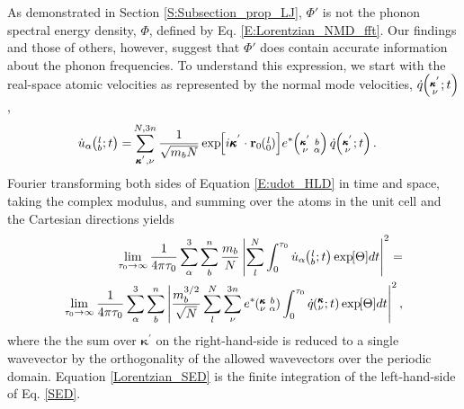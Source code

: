 As demonstrated in Section \ref{S:Subsection_prop_LJ}, $\Phi'$ is not 
the phonon spectral energy density, $\Phi$, defined by Eq$.$ 
\eqref{E:Lorentzian_NMD_fft}. Our findings and those of others,
\cite{maruyama_molecular_2003,koker_thermal_2009,
thomas_predicting_2010,qiu_molecular_2011,shiomi_thermal_2011} 
however, suggest that $\Phi'$ does contain accurate information about 
the phonon frequencies. To understand this expression, we start with 
the real-space atomic velocities as 
represented by the normal mode velocities, $\dot{q}\mspace{-4.0mu}\left(\mspace{-8.0mu} \begin{smallmatrix}&\pmb{\kappa}^{'} \\&\nu\end{smallmatrix} \mspace{-2.0mu};t\right)$ 
\cite{dove_introduction_1993},
\begin{equation}\label{E:udot_HLD}
\begin{split}
\dot{u}_{\alpha}\lbt = &\SUMprime{2}{} \frac{1}{\sqrt{m_bN}} 
\EXP{i\pmb{\kappa}^{'}\cdot\mathbf{r}_0\ab{l}{0}} e^*\kpvba 
\dot{q}\kpvt{}{}{}.
\end{split}
\end{equation}
Fourier transforming both sides of Equation \eqref{E:udot_HLD} in time 
and space, taking the complex modulus, and summing over the atoms in 
the unit cell 
and the Cartesian directions yields
\begin{equation}\label{SED}
\begin{split}
\lim_{\tau_0\rightarrow\infty}\frac{1}{4\pi\tau_0} \sum_\alpha^3 
\sum_b^n \frac{m_b}{N} 
\left\lvert \sum_l^N  \int_{0}^{\tau_0} \dot{u}_{\alpha}\lbt 
\EXP{\Theta} dt \right\rvert^2 =
\\ \lim_{\tau_0\rightarrow\infty}\frac{1}{4\pi\tau_0} \sum_\alpha^3 
\sum_b^n 
\left\lvert \frac{m_b^{3/2}}{\sqrt{N}} \sum_l^N \sum_{\nu}^{3n} e^*\kvba 
\int_{0}^{\tau_0}\dot{q}\kvt\EXP{\Theta}dt \right\rvert^2 ,
\end{split}
\end{equation}
where the the sum over $\pmb{\kappa}^{'}$ on the right-hand-side is 
reduced to a 
single wavevector by the orthogonality of the allowed wavevectors over 
the periodic 
domain. Equation \eqref{Lorentzian_SED} is the finite integration of the 
left-hand-side of Eq. \eqref{SED}.

